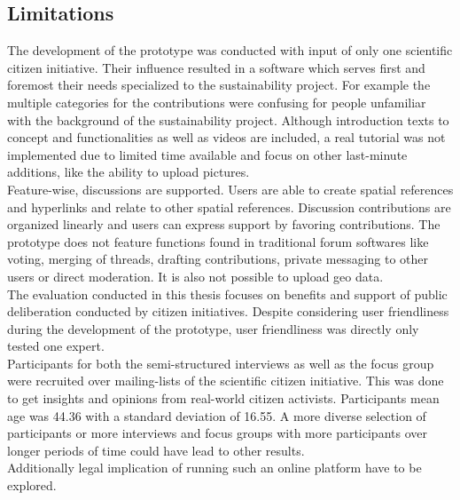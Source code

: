 \subsection{Limitations}
\label{sub:limitations}
The development of the prototype was conducted with input of only one scientific citizen initiative. Their influence resulted in a software which serves first and foremost their needs specialized to the sustainability project. For example the multiple categories for the contributions were confusing for people unfamiliar with the background of the sustainability project. Although introduction texts to concept and functionalities as well as videos are included, a real tutorial was not implemented due to limited time available and focus on other last-minute additions, like the ability to upload pictures.\\
Feature-wise, discussions are supported. Users are able to create spatial references and hyperlinks and relate to other spatial references. Discussion contributions are organized linearly and users can express support by favoring contributions. The prototype does not feature functions found in traditional forum softwares like voting, merging of threads, drafting contributions, private messaging to other users or direct moderation. It is also not possible to upload geo data.\\%
The evaluation conducted in this thesis focuses on benefits and support of public deliberation conducted by citizen initiatives. Despite considering user friendliness during the development of the prototype, user friendliness was directly only tested one expert.\\
Participants for both the semi-structured interviews as well as the focus group were recruited over mailing-lists of the scientific citizen initiative. This was done to get insights and opinions from real-world citizen activists. Participants mean age was 44.36 with a standard deviation of 16.55. A more diverse selection of participants or more interviews and focus groups with more participants over longer periods of time could have lead to other results.\\
Additionally legal implication of running such an online platform have to be explored.


